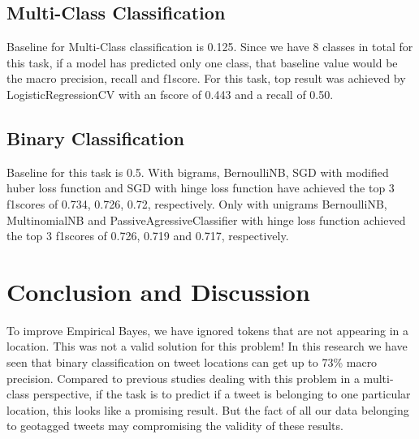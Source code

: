 \documentclass[twoside,11pt]{article}
\begin{document}
\subsection{Multi-Class Classification}
Baseline for Multi-Class classification is 0.125. Since we have 8 classes in total for this task, if a model has predicted only one class, that baseline value would be the macro precision, recall and f1score. 
For this task, top result was achieved by LogisticRegressionCV with an fscore of 0.443 and a recall of 0.50.

\subsection{Binary Classification}
Baseline for this task is 0.5. With bigrams, BernoulliNB, SGD with modified huber loss function and SGD with hinge loss function have achieved the top 3 f1scores of 0.734, 0.726, 0.72, respectively. 
Only with unigrams BernoulliNB, MultinomialNB and PassiveAgressiveClassifier with hinge loss function achieved the top 3 f1scores of 0.726, 0.719 and 0.717, respectively. 


\section{Conclusion and Discussion}
To improve Empirical Bayes, we have ignored tokens that are not appearing in a location. This was not a valid solution for this problem!
In this research we have seen that binary classification on tweet locations can get up to 73\% macro precision. Compared to previous studies dealing with this problem in a multi-class perspective, if the task is to predict if a tweet is belonging to one particular location, this looks like a promising result. But the fact of all our data belonging to geotagged tweets may compromising the validity of these results.
\end{document}
